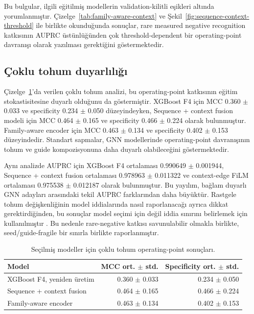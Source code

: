 Bu bulgular, ilgili eğitilmiş modellerin validation-kilitli eşikleri altında yorumlanmıştır. Çizelge~\ref{tab:family-aware-context} ve Şekil~\ref{fig:sequence-context-threshold} ile birlikte okunduğunda sonuçlar, rare measured negative recognition katkısının AUPRC üstünlüğünden çok threshold-dependent bir operating-point davranışı olarak yazılması gerektiğini göstermektedir.

\subsection{Çoklu tohum duyarlılığı}

Çizelge~\ref{tab:operating-point-tohum}'da verilen çoklu tohum analizi, bu operating-point katkısının eğitim stokastisitesine duyarlı olduğunu da göstermiştir. XGBoost F4 için MCC 0.360 $\pm$ 0.033 ve specificity 0.234 $\pm$ 0.050 düzeyindeyken, Sequence + context fusion modeli için MCC 0.464 $\pm$ 0.165 ve specificity 0.466 $\pm$ 0.224 olarak bulunmuştur. Family-aware encoder için MCC 0.463 $\pm$ 0.134 ve specificity 0.402 $\pm$ 0.153 düzeyindedir. Standart sapmalar, GNN modellerinde operating-point davranışının tohum ve guide kompozisyonuna daha duyarlı olabileceğini göstermektedir.

Aynı analizde AUPRC için XGBoost F4 ortalaması 0.990649 $\pm$ 0.001944, Sequence + context fusion ortalaması 0.978963 $\pm$ 0.011322 ve context-edge FiLM ortalaması 0.975538 $\pm$ 0.012187 olarak bulunmuştur. Bu yayılım, bağlam duyarlı GNN adayları arasındaki tekil AUPRC farklarından daha büyüktür. Rastgele tohum değişkenliğinin model iddialarında nasıl raporlanacağı ayrıca dikkat gerektirdiğinden, bu sonuçlar model seçimi için değil iddia sınırını belirlemek için kullanılmıştır . Bu nedenle rare-negative katkısı savunulabilir olmakla birlikte, seed/guide-fragile bir sınırla birlikte raporlanmıştır.

\begin{table}[htbp]
\caption{Seçilmiş modeller için çoklu tohum operating-point sonuçları.}
\label{tab:operating-point-tohum}
\centering
\scriptsize
\begin{tabularx}{\textwidth}{>{\raggedright\arraybackslash}X r r}
\toprule\toprule
Model & MCC ort. $\pm$ std. & Specificity ort. $\pm$ std.\\
\midrule
XGBoost F4, yeniden üretim & 0.360 $\pm$ 0.033 & 0.234 $\pm$ 0.050\\
Sequence + context fusion & 0.464 $\pm$ 0.165 & 0.466 $\pm$ 0.224\\
Family-aware encoder & 0.463 $\pm$ 0.134 & 0.402 $\pm$ 0.153\\
\bottomrule
\end{tabularx}
\end{table}


